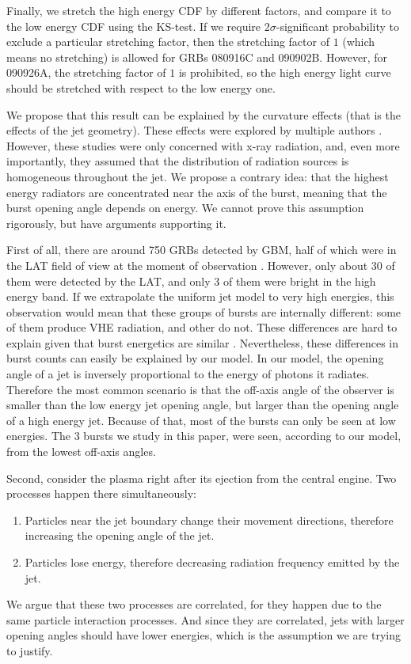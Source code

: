 \documentclass{article}
\begin{document}
Finally, we stretch the high energy CDF by different factors, and compare it to the low energy CDF using the KS-test. If we require $2\sigma$-significant probability to exclude a particular stretching factor, then the stretching factor of $1$ (which means no stretching) is allowed for GRBs 080916C and 090902B. However, for 090926A, the stretching factor of $1$ is prohibited, so the high energy light curve should be stretched with respect to the low energy one.

We propose that this result can be explained by the curvature effects (that is the effects of the jet geometry). These effects were explored by multiple authors \cite{Nakamura:2001kd,Shen:2005ea,Shenoy:2013cba}. However, these studies were only concerned with x-ray radiation, and, even more importantly, they assumed that the distribution of radiation sources is homogeneous throughout the jet. We propose a contrary idea: that the highest energy radiators are concentrated near the axis of the burst, meaning that the burst opening angle depends on energy. We cannot prove this assumption rigorously, but have arguments supporting it.

First of all, there are around 750 GRBs detected by GBM, half of which were in the LAT field of view at the moment of observation \cite{Vianello:2013ela}. However, only about 30 of them were detected by the LAT, and only 3 of them were bright in the high energy band. If we extrapolate the uniform jet model to very high energies, this observation would mean that these groups of bursts are internally different: some of them produce VHE radiation, and other do not. These differences are hard to explain given that burst energetics are similar \cite{Bloom:2003wy}. Nevertheless, these differences in burst counts can easily be explained by our model. In our model, the opening angle of a jet is inversely proportional to the energy of photons it radiates. Therefore the most common scenario is that the off-axis angle of the observer is smaller than the low energy jet opening angle, but larger than the opening angle of a high energy jet. Because of that, most of the bursts can only be seen at low energies. The 3 bursts we study in this paper, were seen, according to our model, from the lowest off-axis angles.

Second, consider the plasma right after its ejection from the central engine. Two processes happen there simultaneously:
\begin{enumerate}
	\item{Particles near the jet boundary change their movement directions, therefore increasing the opening angle of the jet.}
	\item{Particles lose energy, therefore decreasing radiation frequency emitted by the jet.}
\end{enumerate}
We argue that these two processes are correlated, for they happen due to the same particle interaction processes. And since they are correlated, jets with larger opening angles should have lower energies, which is the assumption we are trying to justify.
\end{document}
